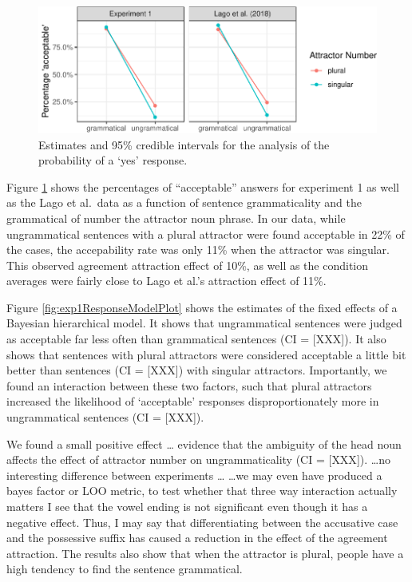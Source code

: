 \documentclass[doc]{apa6}
\begin{document}
\begin{figure}
\centering
\includegraphics{paper_draft_files/figure-latex/exp1AvgResponse-1.pdf}
\caption{\label{fig:exp1AvgResponse}Estimates and 95\% credible intervals for the analysis of the probability of a `yes' response.}
\end{figure}

Figure \ref{fig:exp1AvgResponse} shows the percentages of ``acceptable'' answers for experiment 1 as well as the Lago et al.~data as a function of sentence grammaticality and the grammatical of number the attractor noun phrase. In our data, while ungrammatical sentences with a plural attractor were found acceptable in 22\% of the cases, the accepability rate was only 11\% when the attractor was singular.
This observed agreement attraction effect of 10\%, as well as the condition averages were fairly close to Lago et al.'s attraction effect of 11\%.

Figure \ref{fig:exp1ResponseModelPlot} shows the estimates of the fixed effects of a Bayesian hierarchical model. It shows that ungrammatical sentences were judged as acceptable far less often than grammatical sentences (CI = {[}XXX{]}). It also shows that sentences with plural attractors were considered acceptable a little bit better than sentences (CI = {[}XXX{]}) with singular attractors. Importantly, we found an interaction between these two factors, such that plural attractors increased the likelihood of `acceptable' responses disproportionately more in ungrammatical sentences (CI = {[}XXX{]}).

We found a small positive effect \ldots
evidence that the ambiguity of the head noun affects the effect of attractor number on ungrammaticality (CI = {[}XXX{]}).
\ldots no interesting difference between experiments \ldots
\ldots we may even have produced a bayes factor or LOO metric, to test whether that three way interaction actually matters
I see that the vowel ending is not significant even though it has a negative effect.
Thus, I may say that differentiating between the accusative case and the possessive suffix has caused a reduction in the effect of the agreement attraction. The results also show that when the attractor is plural, people have a high tendency to find the sentence grammatical.
\end{document}
